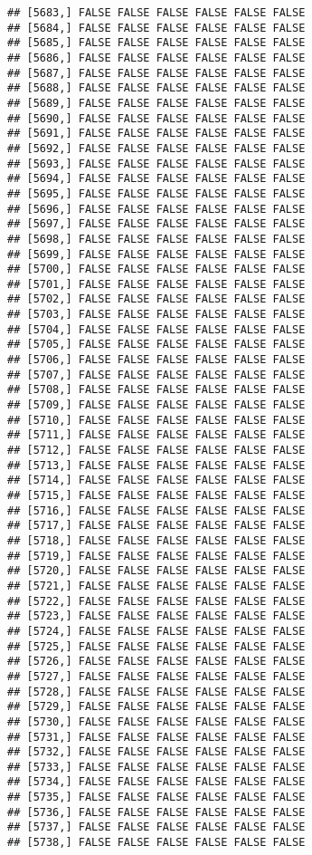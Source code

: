 \documentclass[
]{article}
\begin{document}
\begin{verbatim}
## [5683,] FALSE FALSE FALSE FALSE FALSE FALSE
## [5684,] FALSE FALSE FALSE FALSE FALSE FALSE
## [5685,] FALSE FALSE FALSE FALSE FALSE FALSE
## [5686,] FALSE FALSE FALSE FALSE FALSE FALSE
## [5687,] FALSE FALSE FALSE FALSE FALSE FALSE
## [5688,] FALSE FALSE FALSE FALSE FALSE FALSE
## [5689,] FALSE FALSE FALSE FALSE FALSE FALSE
## [5690,] FALSE FALSE FALSE FALSE FALSE FALSE
## [5691,] FALSE FALSE FALSE FALSE FALSE FALSE
## [5692,] FALSE FALSE FALSE FALSE FALSE FALSE
## [5693,] FALSE FALSE FALSE FALSE FALSE FALSE
## [5694,] FALSE FALSE FALSE FALSE FALSE FALSE
## [5695,] FALSE FALSE FALSE FALSE FALSE FALSE
## [5696,] FALSE FALSE FALSE FALSE FALSE FALSE
## [5697,] FALSE FALSE FALSE FALSE FALSE FALSE
## [5698,] FALSE FALSE FALSE FALSE FALSE FALSE
## [5699,] FALSE FALSE FALSE FALSE FALSE FALSE
## [5700,] FALSE FALSE FALSE FALSE FALSE FALSE
## [5701,] FALSE FALSE FALSE FALSE FALSE FALSE
## [5702,] FALSE FALSE FALSE FALSE FALSE FALSE
## [5703,] FALSE FALSE FALSE FALSE FALSE FALSE
## [5704,] FALSE FALSE FALSE FALSE FALSE FALSE
## [5705,] FALSE FALSE FALSE FALSE FALSE FALSE
## [5706,] FALSE FALSE FALSE FALSE FALSE FALSE
## [5707,] FALSE FALSE FALSE FALSE FALSE FALSE
## [5708,] FALSE FALSE FALSE FALSE FALSE FALSE
## [5709,] FALSE FALSE FALSE FALSE FALSE FALSE
## [5710,] FALSE FALSE FALSE FALSE FALSE FALSE
## [5711,] FALSE FALSE FALSE FALSE FALSE FALSE
## [5712,] FALSE FALSE FALSE FALSE FALSE FALSE
## [5713,] FALSE FALSE FALSE FALSE FALSE FALSE
## [5714,] FALSE FALSE FALSE FALSE FALSE FALSE
## [5715,] FALSE FALSE FALSE FALSE FALSE FALSE
## [5716,] FALSE FALSE FALSE FALSE FALSE FALSE
## [5717,] FALSE FALSE FALSE FALSE FALSE FALSE
## [5718,] FALSE FALSE FALSE FALSE FALSE FALSE
## [5719,] FALSE FALSE FALSE FALSE FALSE FALSE
## [5720,] FALSE FALSE FALSE FALSE FALSE FALSE
## [5721,] FALSE FALSE FALSE FALSE FALSE FALSE
## [5722,] FALSE FALSE FALSE FALSE FALSE FALSE
## [5723,] FALSE FALSE FALSE FALSE FALSE FALSE
## [5724,] FALSE FALSE FALSE FALSE FALSE FALSE
## [5725,] FALSE FALSE FALSE FALSE FALSE FALSE
## [5726,] FALSE FALSE FALSE FALSE FALSE FALSE
## [5727,] FALSE FALSE FALSE FALSE FALSE FALSE
## [5728,] FALSE FALSE FALSE FALSE FALSE FALSE
## [5729,] FALSE FALSE FALSE FALSE FALSE FALSE
## [5730,] FALSE FALSE FALSE FALSE FALSE FALSE
## [5731,] FALSE FALSE FALSE FALSE FALSE FALSE
## [5732,] FALSE FALSE FALSE FALSE FALSE FALSE
## [5733,] FALSE FALSE FALSE FALSE FALSE FALSE
## [5734,] FALSE FALSE FALSE FALSE FALSE FALSE
## [5735,] FALSE FALSE FALSE FALSE FALSE FALSE
## [5736,] FALSE FALSE FALSE FALSE FALSE FALSE
## [5737,] FALSE FALSE FALSE FALSE FALSE FALSE
## [5738,] FALSE FALSE FALSE FALSE FALSE FALSE

\end{verbatim}
\end{document}
